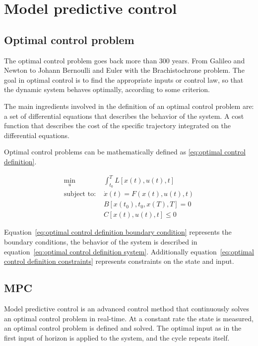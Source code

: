 \chapter{Model predictive control}
\section{Optimal control problem}
	The optimal control problem goes back more than 300 years. From Galileo and Newton to Johann Bernoulli and Euler with the Brachistochrone problem. The goal in optimal control is to find the appropriate inputs or control law, so that the dynamic system behaves optimally, according to some criterion. 
	
	The main ingredients involved in the definition of an optimal control problem are: a set of differential equations that describes the behavior of the system. A cost function that describes the cost of the specific trajectory integrated on the differential equations.
	
	Optimal control problems can be mathematically defined as \eqref{eq:optimal control definition}.
	
	\begin{subequations}\label{eq:optimal control definition}
		\begin{alignat}{4}
		\min_u \ & \int_{t_0}^{T} L[x(t),u(t),t] \label{eq:optimal control definition cost}\\ 
		\text{subject to: } & \dot{x}(t) = F(x(t),u(t),t) \label{eq:optimal control definition system}\\
		& B[x(t_0),t_0,x(T),T]=0  \label{eq:optimal control definition boundary condition}\\
		& C[x(t),u(t),t]\le 0  \label{eq:optimal control definition constraints}
		\end{alignat}
	\end{subequations}
	
	Equation~\ref{eq:optimal control definition boundary condition} represents the boundary conditions, the behavior of the system is described in equation~\ref{eq:optimal control definition system}. Additionally equation~\ref{eq:optimal control definition constraints} represents constraints on the state and input.

\section{MPC}
	Model predictive control is an advanced control method that continuously solves an  optimal control problem in real-time. At a constant rate the state is measured, an optimal control problem is defined and solved. The optimal input as in the first input of horizon is applied to the system, and the cycle repeats itself.
	
